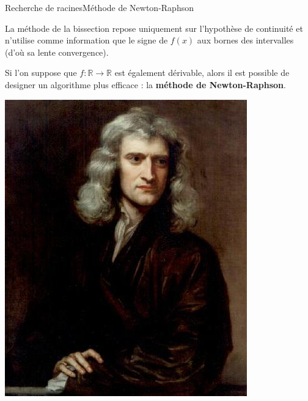 \documentclass[usenames,dvipsnames,svgnames,10pt,aspectratio=169]{beamer}
\begin{document}
\begin{frame}[t, c]{Recherche de racines}{Méthode de Newton-Raphson}
  \begin{minipage}{.68\textwidth}
    La méthode de la bissection repose uniquement sur l'hypothèse de continuité et n'utilise comme information que le signe de $f(x)$ aux bornes des intervalles (d'où sa lente convergence).

    \bigskip

    Si l'on suppose que $f : \mathbb{R} \to \mathbb{R}$ est également dérivable, alors il est possible de designer un algorithme plus efficace : la \alert{\textbf{méthode de Newton-Raphson}}.
  \end{minipage}%
  \hfill
  \begin{minipage}{.28\textwidth}
    \centering
    \includegraphics[width=\textwidth]{newton_portrait}
  \end{minipage}

  \vspace{1cm}
\end{frame}
\end{document}

